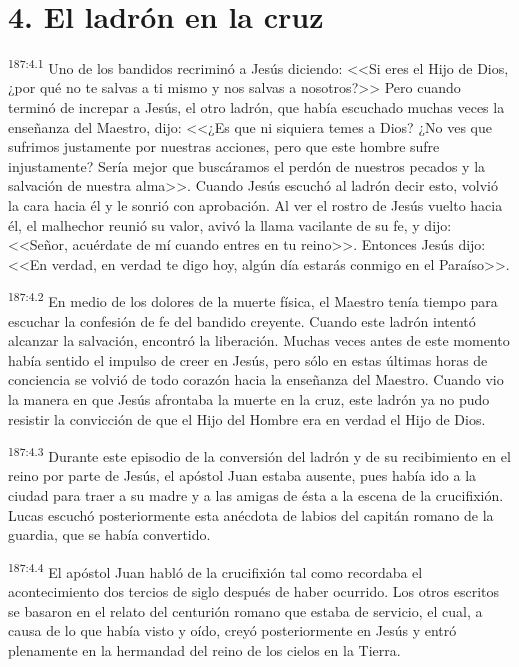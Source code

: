 \section*{4. El ladrón en la cruz}
\par 
\textsuperscript{187:4.1} Uno de los bandidos recriminó a Jesús diciendo: <<Si eres el Hijo de Dios, ¿por qué no te salvas a ti mismo y nos salvas a nosotros?>> Pero cuando terminó de increpar a Jesús, el otro ladrón, que había escuchado muchas veces la enseñanza del Maestro, dijo: <<¿Es que ni siquiera temes a Dios? ¿No ves que sufrimos justamente por nuestras acciones, pero que este hombre sufre injustamente? Sería mejor que buscáramos el perdón de nuestros pecados y la salvación de nuestra alma>>. Cuando Jesús escuchó al ladrón decir esto, volvió la cara hacia él y le sonrió con aprobación. Al ver el rostro de Jesús vuelto hacia él, el malhechor reunió su valor, avivó la llama vacilante de su fe, y dijo: <<Señor, acuérdate de mí cuando entres en tu reino>>. Entonces Jesús dijo: <<En verdad, en verdad te digo hoy, algún día estarás conmigo en el Paraíso>>.

\par 
\textsuperscript{187:4.2} En medio de los dolores de la muerte física, el Maestro tenía tiempo para escuchar la confesión de fe del bandido creyente. Cuando este ladrón intentó alcanzar la salvación, encontró la liberación. Muchas veces antes de este momento había sentido el impulso de creer en Jesús, pero sólo en estas últimas horas de conciencia se volvió de todo corazón hacia la enseñanza del Maestro. Cuando vio la manera en que Jesús afrontaba la muerte en la cruz, este ladrón ya no pudo resistir la convicción de que el Hijo del Hombre era en verdad el Hijo de Dios.

\par 
\textsuperscript{187:4.3} Durante este episodio de la conversión del ladrón y de su recibimiento en el reino por parte de Jesús, el apóstol Juan estaba ausente, pues había ido a la ciudad para traer a su madre y a las amigas de ésta a la escena de la crucifixión. Lucas escuchó posteriormente esta anécdota de labios del capitán romano de la guardia, que se había convertido.

\par 
\textsuperscript{187:4.4} El apóstol Juan habló de la crucifixión tal como recordaba el acontecimiento dos tercios de siglo después de haber ocurrido. Los otros escritos se basaron en el relato del centurión romano que estaba de servicio, el cual, a causa de lo que había visto y oído, creyó posteriormente en Jesús y entró plenamente en la hermandad del reino de los cielos en la Tierra.

